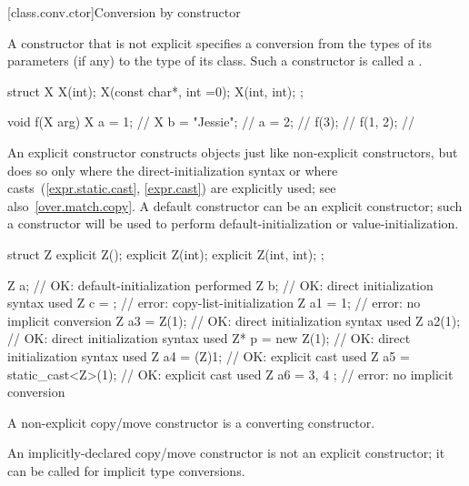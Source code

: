 [class.conv.ctor]{Conversion by constructor}%
%

\pnum
A constructor that is not explicit
specifies a conversion from
the types of its parameters (if any)
to the type of its class.
Such a constructor is called a
.
\begin{example}
%
\begin{codeblock}
struct X {
    X(int);
    X(const char*, int =0);
    X(int, int);
};

void f(X arg) {
  X a = 1;          // 
  X b = "Jessie";   // 
  a = 2;            // 
  f(3);             // 
  f({1, 2});        // 
}
\end{codeblock}
\end{example}

\pnum
\begin{note}
An explicit constructor constructs objects just like non-explicit
constructors, but does so only where the direct-initialization syntax
or where casts~(\ref{expr.static.cast}, \ref{expr.cast}) are explicitly
used; see also~\ref{over.match.copy}.
A default constructor can be an explicit constructor; such a constructor
will be used to perform default-initialization
or value-initialization.
\begin{example}
\begin{codeblock}
struct Z {
  explicit Z();
  explicit Z(int);
  explicit Z(int, int);
};

Z a;                            // OK: default-initialization performed
Z b{};                          // OK: direct initialization syntax used
Z c = {};                       // error: copy-list-initialization
Z a1 = 1;                       // error: no implicit conversion
Z a3 = Z(1);                    // OK: direct initialization syntax used
Z a2(1);                        // OK: direct initialization syntax used
Z* p = new Z(1);                // OK: direct initialization syntax used
Z a4 = (Z)1;                    // OK: explicit cast used
Z a5 = static_cast<Z>(1);       // OK: explicit cast used
Z a6 = { 3, 4 };                // error: no implicit conversion
\end{codeblock}
\end{example}
\end{note}

\pnum
A non-explicit copy/move constructor is
a converting constructor.
\begin{note}
An implicitly-declared copy/move constructor is not an explicit constructor;
it can be called for implicit type conversions.
\end{note}

